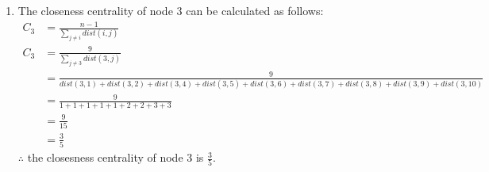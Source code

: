 \documentclass{article}
\begin{document}
\begin{enumerate}[label=(\alph*), left=10pt, itemsep=10pt]
        \item \begin{minipage}[t]{0.9\textwidth}
                The closeness centrality of node 3 can be calculated as follows:
                \begin{align*}
                    C_{3}   &=  \frac{n-1}{\sum_{j\neq i}^{} dist(i,j)}\\
                    C_{3}   &=  \frac{9}{\sum_{j\neq 3}^{} dist(3,j)}\\
                            &=  \frac{9}{dist(3,1) + dist(3,2) + dist(3,4) + dist(3,5) +
                                dist(3,6) + dist(3,7) + dist(3,8) + dist(3,9) + dist(3,10)}\\
                            &=  \frac{9}{1+1+1+1+1+2+2+3+3}\\
                            &= \frac{9}{15}\\
                            &= \frac{3}{5}
                \end{align*}
                $\therefore$ the closesness centrality of node 3 is $\displaystyle \frac{3}{5}$.
            \end{minipage}
    
        \newpage
    

\end{enumerate}
\end{document}
